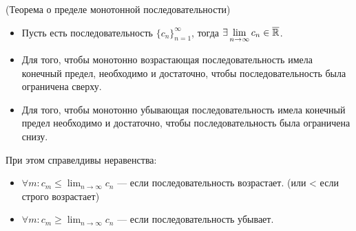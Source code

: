 \begin{theorem} (Теорема о пределе монотонной последовательности)
    \begin{itemize}
        \item Пусть есть последовательность $\{c_n\}_{n=1}^\infty$, тогда $\exists \lim_{n \to \infty} c_n \in \overline{\R}$.

        \item Для того, чтобы монотонно возрастающая последовательность имела конечный предел, необходимо и достаточно, чтобы последовательность была ограничена сверху.

        \item Для того, чтобы монотонно убывающая последовательность имела конечный предел необходимо и достаточно, чтобы последовательность была ограничена снизу.
    \end{itemize}
    При этом справелдивы неравенства:
    \begin{itemize}
        \item $\forall m: c_m \leq \lim_{n \to \infty} c_n$ --- если последовательность возрастает. (или < если строго возрастает)
        \item $\forall m: c_m \geq \lim_{n \to \infty} c_n$ --- если последовательность убывает.
    \end{itemize}

\end{theorem}

